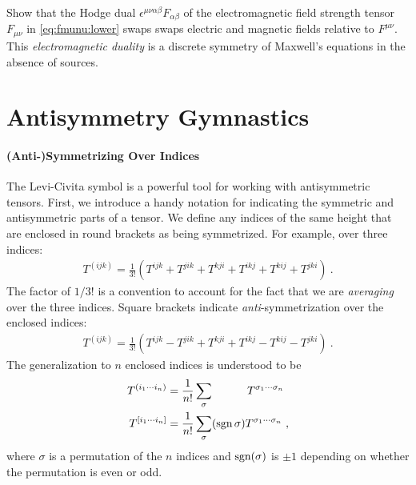 \documentclass[12pt, oneside]{report}    %
\let\oldsection\section
\def\section{%
  \setcounter{sidenote}{1}%
  \oldsection
}
\begin{document}
\begin{exercise}
Show that the Hodge dual $\epsilon^{\mu\nu\alpha\beta}F_{\alpha\beta}$ of the electromagnetic field strength tensor $F_{\mu\nu}$ in \eqref{eq:fmunu:lower} swaps swaps electric and magnetic fields relative to $F^{\mu\nu}$. This  \emph{electromagnetic duality} is a discrete symmetry of Maxwell's equations in the absence of sources. 
\end{exercise}

\section{Antisymmetry Gymnastics}
\label{sec:antisymmetric:dynamics}

\paragraph{(Anti-)Symmetrizing Over Indices}
The Levi-Civita symbol is a powerful tool for working with antisymmetric tensors. First, we introduce a handy notation for indicating the symmetric and antisymmetric parts of a tensor. We define any indices of the same height that are enclosed in round brackets as being symmetrized. For example, over three indices: 
\begin{align}
    T^{(ijk)} = \frac{1}{3!}\left(T^{ijk} + T^{jik} + T^{kji}
                      + T^{ikj} + T^{kij} + T^{jki}\right) \ .
\end{align}
The factor of $1/3!$ is a convention to account for the fact that we are \emph{averaging} over the three indices. Square brackets indicate \emph{anti}-symmetrization over the enclosed indices:
\begin{align}
    T^{(ijk)} = \frac{1}{3!}\left(T^{ijk} - T^{jik} + T^{kji}
                      + T^{ikj} - T^{kij} - T^{jki}\right) \ .
\end{align}
The generalization to $n$ enclosed indices is understood to be
\begin{align}
    T^{(i_1\cdots i_n)} &= 
    \frac{1}{n!}\sum_{\sigma} \phantom{(\sgn{\sigma})} T^{\sigma_1\cdots\sigma_n}
    \\
    T^{[i_1\cdots i_n]} &= 
    \frac{1}{n!}\sum_{\sigma} (\sgn{\sigma}) T^{\sigma_1\cdots\sigma_n} \ ,
\end{align}
where $\sigma$ is a permutation of the $n$ indices and $\operatorname{\textnormal{sgn}}(\sigma)$ is $\pm 1$ depending on whether the permutation is even or odd. 
\end{document}

